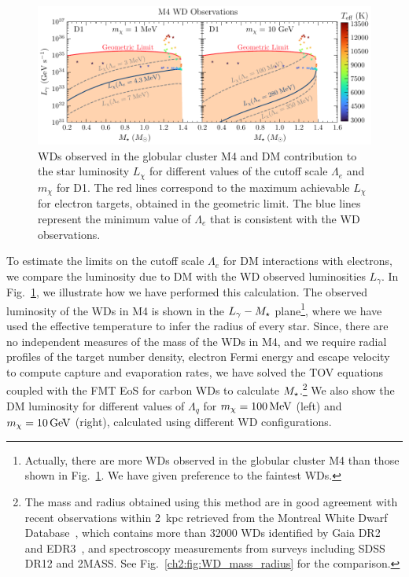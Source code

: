 \begin{figure}[t!bp]
    \centering
    \includegraphics[width=\textwidth]{wd_capture/Lum_WDmass_M4.pdf}
    \caption[WDs observed in the globular cluster M4 and DM contribution to the star luminosity $L_\chi$ for different values of the cutoff scale $\Lambda_e$ and $m_\chi$ for D1.]{WDs observed in the globular cluster M4 and DM contribution to the star luminosity $L_\chi$ for different values of the cutoff scale $\Lambda_e$ and $m_\chi$ for D1. The red lines correspond to the maximum achievable $L_\chi$ for electron targets, obtained in the geometric limit. The blue lines represent the minimum value of $\Lambda_e$ that is consistent with the WD observations. }
    \label{ch4:fig:limitset}
\end{figure}


To estimate the limits on the cutoff scale $\Lambda_e$ for DM interactions with electrons, we compare the luminosity due to DM  with the WD observed luminosities $L_\gamma$. In Fig.~\ref{ch4:fig:limitset}, we illustrate how we have performed this calculation.
The observed luminosity of the WDs in M4 is shown in the $L_\gamma-M_\star$ plane\footnote{Actually, there are more WDs observed in the globular cluster M4 than those shown in Fig.~\ref{ch4:fig:limitset}. We have given preference to the faintest WDs.}, where we have used the effective temperature to infer the radius of every star. Since, there are no independent measures of the mass of the WDs in M4, and we require radial profiles of the target number density, electron Fermi energy and escape velocity to compute capture and evaporation rates, we have solved the TOV equations coupled with the FMT EoS for carbon WDs to calculate $M_\star$.\footnote{The mass and radius obtained using this method are in good agreement with recent observations within 2~kpc retrieved from the Montreal White Dwarf Database~\cite{Dufour_mar_Montrealwhitedwarf}, which contains more than 32000 WDs identified by Gaia DR2~\cite{Torres_feb_GaiaDR2halo} and EDR3~\cite{Gaia:2020wqu_may_Gaiaearlydata}, and spectroscopy measurements from surveys including SDSS DR12 and 2MASS. See Fig.~\ref{ch2:fig:WD_mass_radius} for the comparison.}  We also show the DM luminosity for different values of $\Lambda_q$ for $m_\chi=100{\rm \,MeV}$ (left) and $m_\chi=10{\rm \,GeV}$ (right), calculated using different WD configurations. 

